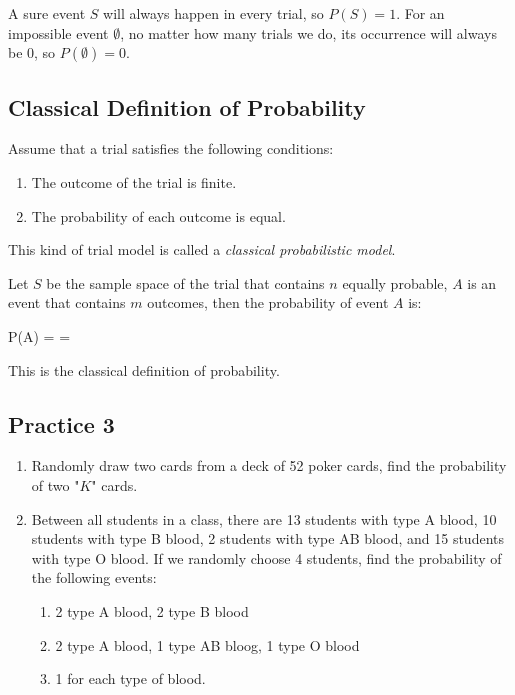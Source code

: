 \documentclass{report}
\begin{document}
\begin{multicols}{2}
  A sure event $S$ will always happen in every trial, so $P(S) = 1$. For an
  impossible event $\emptyset$, no matter how many trials we do, its occurrence
  will always be 0, so $P(\emptyset) = 0$.

  \subsection*{Classical Definition of Probability}

  Assume that a trial satisfies the following conditions:

  \begin{enumerate}
    \item The outcome of the trial is finite.
    \item The probability of each outcome is equal.
  \end{enumerate}

  This kind of trial model is called a \emph{classical probabilistic model}.

  Let $S$ be the sample space of the trial that contains $n$ equally probable,
  $A$ is an event that contains $m$ outcomes, then the probability of event $A$
  is:
  \begin{cequation}
    P(A) =  = 
  \end{cequation}
  This is the classical definition of probability.

  \subsection{Practice 3}

  \begin{enumerate}
    \item Randomly draw two cards from a deck of 52 poker cards, find the probability of
          two "$K$" cards.

    \item Between all students in a class, there are 13 students with type A blood, 10
          students with type B blood, 2 students with type AB blood, and 15 students with
          type O blood. If we randomly choose 4 students, find the probability of the
          following events:
          \begin{enumerate}
            \item 2 type A blood, 2 type B blood
            \item 2 type A blood, 1 type AB bloog, 1 type O blood
            \item 1 for each type of blood.
          \end{enumerate}


\end{enumerate}
\end{multicols}
\end{document}
